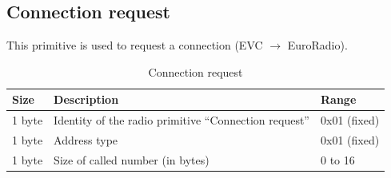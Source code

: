 \documentclass[nocc]{template/openetcs_report}
\begin{document}
\subsection{Connection request}
This primitive is used to request a connection (EVC $\rightarrow$ EuroRadio).
			\begin{longtable}{|l|l|l|}
				\caption{Connection request}\\ 
				\hline
				
					\begin{minipage}[t]{0.1\linewidth} \textbf{Size}	\end{minipage}
				&	\begin{minipage}[t]{0.5\linewidth} \textbf{Description}	\end{minipage}
				&	\begin{minipage}[t]{0.3\linewidth} \textbf{Range} \end{minipage} \\
				
				\hline
					 \begin{minipage}[t]{0.1\linewidth}1 byte \end{minipage}
					&\begin{minipage}[t]{0.6\linewidth}Identity of the radio primitive "`Connection request"'	\end{minipage}
					&\begin{minipage}[t]{0.3\linewidth}0x01 (fixed) \end{minipage} \\
				
				\hline
					\begin{minipage}[t]{0.1\linewidth}1 byte \end{minipage}
					&\begin{minipage}[t]{0.6\linewidth} Address type 	\end{minipage}
					&\begin{minipage}[t]{0.3\linewidth}0x01 (fixed) \end{minipage} \\
				
				\hline
					\begin{minipage}[t]{0.1\linewidth}1 byte \end{minipage}
					&\begin{minipage}[t]{0.6\linewidth} Size of called number (in bytes)	\end{minipage}
					&\begin{minipage}[t]{0.3\linewidth}0 to 16 \end{minipage} \\
				

\end{longtable}
\end{document}
